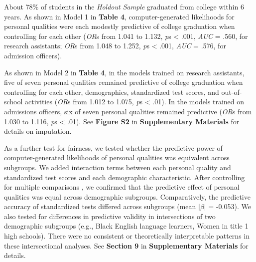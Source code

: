 \documentclass[11pt]{report}
\begin{document}
\begin{mainf}
About 78\% of students in the \textit{Holdout Sample} graduated from college within 6 years. As shown in Model 1 in \textbf{Table 4}, computer-generated likelihoods for personal qualities were each modestly predictive of college graduation when controlling for each other (\textit{OR}s from 1.041 to 1.132, \textit{p}s < .001, \textit{AUC} = .560, for research assistants; \textit{OR}s from 1.048 to 1.252, \textit{p}s < .001, \textit{AUC} = .576, for admission officers). 

As shown in Model 2 in \textbf{Table 4}, in the models trained on research assistants, five of seven personal qualities remained predictive of college graduation when controlling for each other, demographics, standardized test scores, and out-of-school activities (\textit{OR}s from 1.012 to 1.075, \textit{p}s < .01). In the models trained on admissions officers, six of seven personal qualities remained predictive (\textit{OR}s from 1.030 to 1.116, \textit{p}s < .01). See \textbf{Figure S2} in \textbf{Supplementary Materials} for details on imputation.

As a further test for fairness, we tested whether the predictive power of computer-generated likelihoods of personal qualities was equivalent across subgroups. We added interaction terms between each personal quality and standardized test scores and each demographic characteristic. After controlling for multiple comparisons \cite{benjamini_control_2001}, we confirmed that the predictive effect of personal qualities was equal across demographic subgroups. Comparatively, the predictive accuracy of standardized tests differed across subgroups (mean $|\beta|$ = -0.053). We also tested for differences in predictive validity in intersections of two demographic subgroups (e.g., Black English language learners, Women in title 1 high schools). There were no consistent or theoretically interpretable patterns in these intersectional analyses. See \textbf{Section 9} in \textbf{Supplementary Materials} for details.


\end{mainf}
\end{document}
